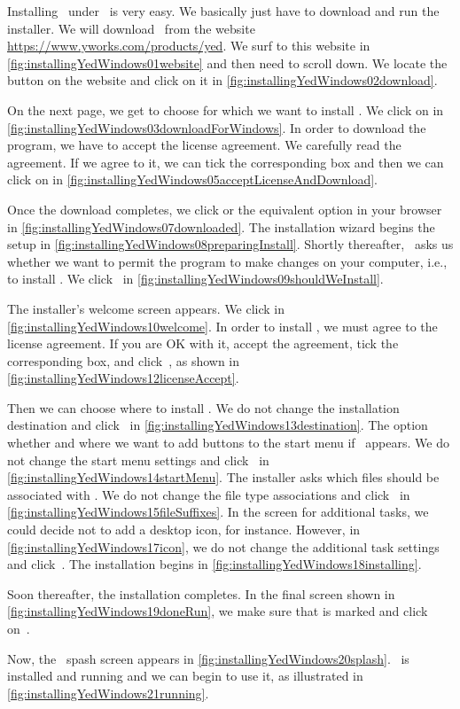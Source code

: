 %
Installing \yEd\ under \microsoftWindows\ is very easy.
We basically just have to download and run the installer.
We will download \yEd\ from the website \url{https://www.yworks.com/products/yed}.
We surf to this website in \cref{fig:installingYedWindows01website} and then need to scroll down.
We locate the  button on the website and click on it in \cref{fig:installingYedWindows02download}.

On the next page, we get to choose for which  we want to install \yEd.
We click on  in \cref{fig:installingYedWindows03downloadForWindows}.
In order to download the program, we have to accept the license agreement.
We carefully read the agreement.
If we agree to it, we can tick the corresponding box and then we can click on  in \cref{fig:installingYedWindows05acceptLicenseAndDownload}.

Once the download completes, we click  or the equivalent option in your browser in \cref{fig:installingYedWindows07downloaded}.
The installation wizard begins the setup in \cref{fig:installingYedWindows08preparingInstall}.
Shortly thereafter, \microsoftWindows\ asks us whether we want to permit the program to make changes on your computer, i.e., to install \yEd.
We click~ in \cref{fig:installingYedWindows09shouldWeInstall}.

The installer's welcome screen appears.
We click  in \cref{fig:installingYedWindows10welcome}.
In order to install \yEd, we must agree to the license agreement.
If you are OK with it, accept the agreement, tick the corresponding box, and click~, as shown in \cref{fig:installingYedWindows12licenseAccept}.

Then we can choose where to install \yEd.
We do not change the installation destination and click~ in \cref{fig:installingYedWindows13destination}.
The option whether and where we want to add buttons to the start menu if \microsoftWindows\ appears.
We do not change the start menu settings and click~ in \cref{fig:installingYedWindows14startMenu}.
The installer asks which files should be associated with \yEd.
We do not change the file type associations and click~ in \cref{fig:installingYedWindows15fileSuffixes}.
In the screen for additional tasks, we could decide not to add a desktop icon, for instance.
However, in \cref{fig:installingYedWindows17icon}, we do not change the additional task settings and click~.
The installation begins in \cref{fig:installingYedWindows18installing}.

Soon thereafter, the installation completes.
In the final screen shown in \cref{fig:installingYedWindows19doneRun}, we make sure that  is marked and click on~.

Now, the \yEd\ spash screen appears in \cref{fig:installingYedWindows20splash}.
\yEd\ is installed and running and we can begin to use it, as illustrated in \cref{fig:installingYedWindows21running}.%
%
\FloatBarrier%
\endhsection%
%
